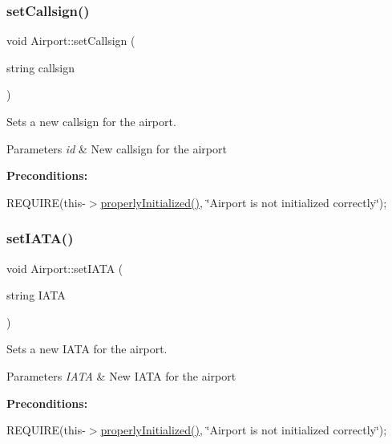 \subsubsection{\texorpdfstring{set\+Callsign()}{setCallsign()}}
{\footnotesize\ttfamily void Airport\+::set\+Callsign (\begin{DoxyParamCaption}\item[{string}]{callsign }\end{DoxyParamCaption})}



Sets a new callsign for the airport. 


\begin{DoxyParams}{Parameters}
{\em id} & New callsign for the airport\\
\hline
\end{DoxyParams}
{\bfseries Preconditions\+:}
\begin{DoxyItemize}
\item R\+E\+Q\+U\+I\+RE(this-\/$>$\mbox{\hyperlink{class_airport_aa13e68ac58e8875837fbe888325cfff6}{properly\+Initialized()}}, \char`\"{}\+Airport is not initialized correctly\char`\"{}); 
\end{DoxyItemize}\mbox{\label{class_airport_a9555c51c003f8acb412e07442cb920c8}} 
\subsubsection{\texorpdfstring{set\+I\+A\+T\+A()}{setIATA()}}
{\footnotesize\ttfamily void Airport\+::set\+I\+A\+TA (\begin{DoxyParamCaption}\item[{string}]{I\+A\+TA }\end{DoxyParamCaption})}



Sets a new I\+A\+TA for the airport. 


\begin{DoxyParams}{Parameters}
{\em I\+A\+TA} & New I\+A\+TA for the airport\\
\hline
\end{DoxyParams}
{\bfseries Preconditions\+:}
\begin{DoxyItemize}
\item R\+E\+Q\+U\+I\+RE(this-\/$>$\mbox{\hyperlink{class_airport_aa13e68ac58e8875837fbe888325cfff6}{properly\+Initialized()}}, \char`\"{}\+Airport is not initialized correctly\char`\"{}); 
\end{DoxyItemize}\mbox{\label{class_airport_a3b8ef3abafb9f29b97acb73eb8014502}} 

